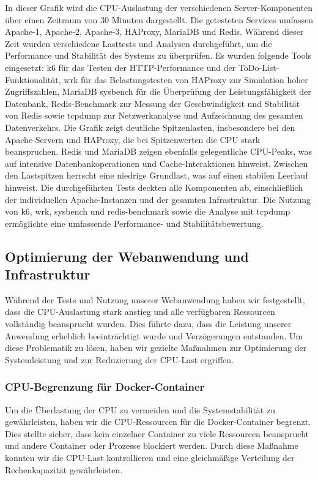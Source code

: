 In dieser Grafik wird die CPU-Auslastung der verschiedenen Server-Komponenten über einen Zeitraum von 30 Minuten dargestellt. Die getesteten Services umfassen Apache-1, Apache-2, Apache-3, HAProxy, MariaDB und Redis. Während dieser Zeit wurden verschiedene Lasttests und Analysen durchgeführt, um die Performance und Stabilität des Systems zu überprüfen. Es wurden folgende Tools eingesetzt: k6 für das Testen der HTTP-Performance und der ToDo-List-Funktionalität, wrk für das Belastungstesten von HAProxy zur Simulation hoher Zugriffszahlen, MariaDB sysbench für die Überprüfung der Leistungsfähigkeit der Datenbank, Redis-Benchmark zur Messung der Geschwindigkeit und Stabilität von Redis sowie tcpdump zur Netzwerkanalyse und Aufzeichnung des gesamten Datenverkehrs. Die Grafik zeigt deutliche Spitzenlasten, insbesondere bei den Apache-Servern und HAProxy, die bei Spitzenwerten die CPU stark beanspruchen. Redis und MariaDB zeigen ebenfalls gelegentliche CPU-Peaks, was auf intensive Datenbankoperationen und Cache-Interaktionen hinweist. Zwischen den Lastspitzen herrscht eine niedrige Grundlast, was auf einen stabilen Leerlauf hinweist. Die durchgeführten Tests deckten alle Komponenten ab, einschließlich der individuellen Apache-Instanzen und der gesamten Infrastruktur. Die Nutzung von k6, wrk, sysbench und redis-benchmark sowie die Analyse mit tcpdump ermöglichte eine umfassende Performance- und Stabilitätsbewertung.   
\subsection{Optimierung der Webanwendung und Infrastruktur}
Während der Tests und Nutzung unserer Webanwendung haben wir festgestellt, dass die CPU-Auslastung stark anstieg und alle verfügbaren Ressourcen vollständig beansprucht wurden. Dies führte dazu, dass die Leistung unserer Anwendung erheblich beeinträchtigt wurde und Verzögerungen entstanden. Um diese Problematik zu lösen, haben wir gezielte Maßnahmen zur Optimierung der Systemleistung und zur Reduzierung der CPU-Last ergriffen.
\subsubsection{CPU-Begrenzung für Docker-Container}
Um die Überlastung der CPU zu vermeiden und die Systemstabilität zu gewährleisten, haben wir die CPU-Ressourcen für die Docker-Container begrenzt. Dies stellte sicher, dass kein einzelner Container zu viele Ressourcen beansprucht und andere Container oder Prozesse blockiert werden. Durch diese Maßnahme konnten wir die CPU-Last kontrollieren und eine gleichmäßige Verteilung der Rechenkapazität gewährleisten.
